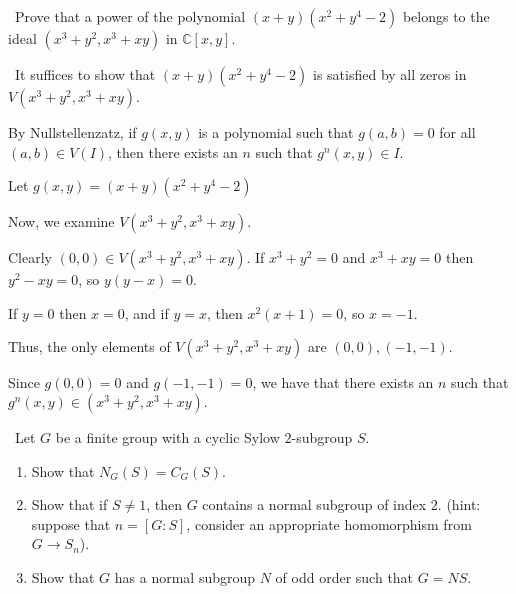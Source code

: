 \documentclass[12pt]{Qual}
\begin{document}
\newpage


\begin{problem} $\,$
Prove that a power of the polynomial $(x+y)(x^2+y^4-2)$ belongs to the ideal $(x^3+y^2,x^3+xy)$ in $\mathbb{C}[x,y]$.
\end{problem}


\begin{solution}$\,$
It suffices to show that $(x+y)(x^2+y^4-2)$ is satisfied by all zeros in $V(x^3+y^2,x^3+xy)$.

By Nullstellenzatz, if $g(x,y)$ is a polynomial such that $g(a,b)=0$ for all $(a,b)\in V(I)$, then there exists an $n$ such that $g^n(x,y)\in I$.

Let $g(x,y)=(x+y)(x^2+y^4-2)$

Now, we examine $V(x^3+y^2,x^3+xy)$.

Clearly $(0,0)\in V(x^3+y^2,x^3+xy)$. If $x^3+y^2=0$ and $x^3+xy=0$ then $y^2-xy=0$, so $y(y-x)=0$.

If $y=0$ then $x=0$, and if $y=x$, then $x^2(x+1)=0$, so $x=-1$.

Thus, the only elements of $V(x^3+y^2,x^3+xy)$ are $(0,0),(-1,-1)$.

Since $g(0,0)=0$ and $g(-1,-1)=0$, we have that there exists an $n$ such that $g^n(x,y)\in(x^3+y^2,x^3+xy).$
\end{solution}
\newpage



\begin{problem} $\,$
Let $G$ be a finite group with a cyclic Sylow $2$-subgroup $S$.
\begin{enumerate}[label=(\alph*)]
    \item Show that $N_G(S)=C_G(S)$.
    \item Show that if $S\not=1$, then $G$ contains a normal subgroup of index $2$. (hint: suppose that $n=[G:S]$, consider an appropriate homomorphism from $G\to S_n$).
    \item Show that $G$ has a normal subgroup $N$ of odd order such that $G=NS$.
\end{enumerate}
\end{problem}
\end{document}
